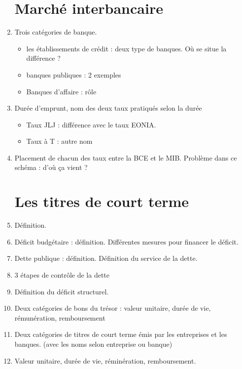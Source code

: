 \documentclass[11pt, twocolumn, landscape]{article}
\begin{document}
\begin{enumerate}
\section{Marché interbancaire}
\item Trois catégories de banque. 
\begin{itemize}
	\item les établissements de crédit : deux type de banques. Où se situe la différence ?
	\item banques publiques : 2 exemples
	\item Banques d'affaire : rôle
\end{itemize}
\item Durée d'emprunt, nom des deux taux pratiqués selon la durée
\begin{itemize}
	\item Taux JLJ : différence avec le taux EONIA.
	\item Taux à T : autre nom
\end{itemize}
\item Placement de chacun des taux entre la BCE et le MIB. Problème dans ce schéma : d'où ça vient ?
\section{Les titres de court terme}
\item Définition. 
\item Déficit budgétaire : définition. Différentes mesures pour financer le déficit. 
\item Dette publique : définition. Définition du service de la dette.
\item 3 étapes de contrôle de la dette
\item Définition du déficit structurel.
\item Deux catégories de bons du trésor : valeur unitaire, durée de vie, rémunération, remboursement
\item Deux catégories de titres de court terme émis par les entreprises et les banques. (avec les noms selon entreprise ou banque)
\item Valeur unitaire, durée de vie, réminération, remboursement.
\end{enumerate}
\end{document}
